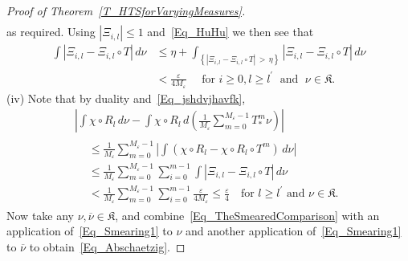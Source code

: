 \documentclass[AHL,Unicode,longabstracts]{cedram}
\newcommand{\frkK}{\mathfrak{K}}
\begin{document}
\begin{proof}[{Proof of Theorem~\ref{T_HTSforVaryingMeasures}}]
\begin{multline*}
\end{multline*}
as required. Using $\left\vert \Xi_{i,l}\right\vert \leq1$ and~\eqref{Eq_HuHu} we then see that
\begin{equation}\label{Eq_jshdvjhavfk}
\begin{split}
\int\left\vert \Xi_{i,l}-\Xi_{i,l}\circ T\right\vert \,d\nu  &\leq\eta +\int_{\left\{\left\vert \Xi_{i,l}-\Xi_{i,l}\circ T\right\vert\,>\,\eta\right\}}\left\vert
\Xi_{i,l}-\Xi_{i,l}\circ T\right\vert \,d\nu\\
&<\frac{\varepsilon}{4M_{\varepsilon}}\quad\text{  for }i\geq0, l\geq l^{\prime}\;\text{ and }\;\nu\in\frkK.
\end{split}
\end{equation}
(iv) \label{prf.theo6.3.4} Note that by duality and~\eqref{Eq_jshdvjhavfk},
\begin{multline}\label{Eq_Smearing1}
 \left\vert \int\chi\circ R_{l}\,d\nu-\int\chi\circ R_{l}\,d\left(\frac {1}{M_{\varepsilon}}\sum_{m=0}^{M_{\varepsilon}-1}T_{\ast}^{m}\nu\right)
\right\vert\\
\begin{aligned}
& \leq\frac{1}{M_{\varepsilon}}\sum_{m=0}^{M_{\varepsilon}-1}\left\vert
\int(\chi\circ R_{l}-\chi\circ R_{l}\circ T^{m})\,d\nu\right\vert \\
& \leq\frac{1}{M_{\varepsilon}}\sum_{m=0}^{M_{\varepsilon}-1}\sum_{i=0} ^{m-1}\int\left\vert \Xi_{i,l}-\Xi_{i,l}\circ T\right\vert \,d\nu\\
& <\frac{1}{M_{\varepsilon}}\sum_{m=0}^{M_{\varepsilon}-1}\sum_{i=0} ^{m-1}\frac{\varepsilon}{4M_{\varepsilon}}\leq\frac{\varepsilon}{4}\quad \text{
for }l\geq l^{\prime}\text{ and }\nu\in\frkK.
\end{aligned}
\end{multline}
Now take any $\nu,\overline{\nu}\in\frkK$, and combine~\eqref{Eq_TheSmearedComparison} with an application of~\eqref{Eq_Smearing1} to $\nu$ and another application of~\eqref{Eq_Smearing1} to $\overline{\nu}$ to obtain~\eqref{Eq_Abschaetzig}.\qedhere
\end{proof}
\end{document}
